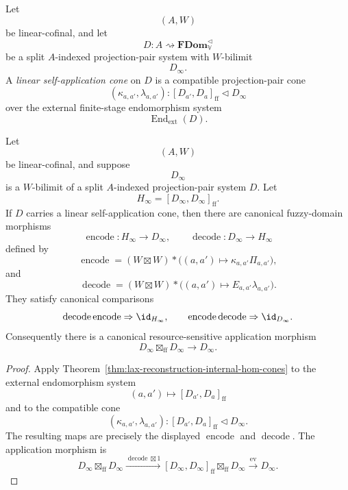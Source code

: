 \begin{definition}
\label{def:linear-self-application-cone}
Let
\[
    (A,W)
\]
be linear-cofinal, and let
\[
    D:A\rightsquigarrow\mathbf{FDom}_{\mathbb V}^{\triangleleft}
\]
be a split \(A\)-indexed projection-pair system with \(W\)-bilimit
\[
    D_\infty.
\]
A \emph{linear self-application cone} on \(D\) is a compatible projection-pair
cone
\[
    (\kappa_{a,a'},\lambda_{a,a'}):
    [D_{a'},D_a]_{\mathrm{ff}}
    \triangleleft
    D_\infty
\]
over the external finite-stage endomorphism system
\[
    \operatorname{End}_{\mathrm{ext}}(D).
\]
\end{definition}

\begin{theorem}
\label{thm:pure-lax-linear-application}
Let
\[
    (A,W)
\]
be linear-cofinal, and suppose
\[
    D_\infty
\]
is a \(W\)-bilimit of a split \(A\)-indexed projection-pair system \(D\).
Let
\[
    H_\infty=[D_\infty,D_\infty]_{\mathrm{ff}}.
\]
If \(D\) carries a linear self-application cone, then there are canonical
fuzzy-domain morphisms
\[
    \operatorname{encode}:H_\infty\to D_\infty,
    \qquad
    \operatorname{decode}:D_\infty\to H_\infty
\]
defined by
\[
    \operatorname{encode}
    =
    (W\boxtimes W)*
    \bigl((a,a')\mapsto
        \kappa_{a,a'}\Pi_{a,a'}
    \bigr),
\]
and
\[
    \operatorname{decode}
    =
    (W\boxtimes W)*
    \bigl((a,a')\mapsto
        E_{a,a'}\lambda_{a,a'}
    \bigr).
\]
They satisfy canonical comparisons
\[
    \operatorname{decode}\operatorname{encode}
    \Rightarrow
    \id_{H_\infty},
    \qquad
    \operatorname{encode}\operatorname{decode}
    \Rightarrow
    \id_{D_\infty}.
\]
Consequently there is a canonical resource-sensitive application morphism
\[
    D_\infty\boxtimes_{\mathrm{ff}}D_\infty
    \longrightarrow
    D_\infty.
\]
\end{theorem}

\begin{proof}
Apply Theorem~\ref{thm:lax-reconstruction-internal-hom-cones} to the external
endomorphism system
\[
    (a,a')\longmapsto [D_{a'},D_a]_{\mathrm{ff}}
\]
and to the compatible cone
\[
    (\kappa_{a,a'},\lambda_{a,a'}):
    [D_{a'},D_a]_{\mathrm{ff}}
    \triangleleft
    D_\infty.
\]
The resulting maps are precisely the displayed
\(\operatorname{encode}\) and \(\operatorname{decode}\).  The application
morphism is
\[
    D_\infty\boxtimes_{\mathrm{ff}}D_\infty
    \xrightarrow{\operatorname{decode}\boxtimes 1}
    [D_\infty,D_\infty]_{\mathrm{ff}}
    \boxtimes_{\mathrm{ff}}
    D_\infty
    \xrightarrow{\operatorname{ev}}
    D_\infty.
\]
\end{proof}

